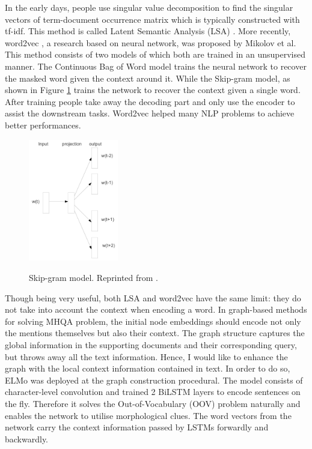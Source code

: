 \documentclass[12pt]{report}
\begin{document}
In the early days, people use singular value decomposition to find the singular vectors of term-document occurrence matrix which is typically constructed with tf-idf. This method is called Latent Semantic Analysis (LSA) \cite{dumais_using_1988}. More recently, word2vec \cite{mikolov_distributed_2013}, a research based on neural network, was proposed by Mikolov et al. This method consists of two models of which both are trained in an unsupervised manner. The Continuous Bag of Word model trains the neural network to recover the masked word given the context around it. While the Skip-gram model, as shown in Figure \ref{skip_gram} trains the network to recover the context given a single word. After training people take away the decoding part and only use the encoder to assist the downstream tasks. Word2vec helped many NLP problems to achieve
better performances.
\begin{figure}[H]
\centering
\includegraphics[width=0.35\textwidth]{figures/skip_gram.png}
\label{skip_gram}
\caption[Skip-gram]{Skip-gram model. Reprinted from \cite{mikolov_distributed_2013}.}
\end{figure}

Though being very useful, both LSA and word2vec have the same limit: they do not take into account the context when encoding a word.
In graph-based methods for solving MHQA problem, the initial node embeddings should encode not only the mentions themselves but also their context. The graph structure captures the global information in the supporting documents and their corresponding query, but throws away all the text information. Hence, I would like to enhance the graph with the local context information contained in text. In order to do so, ELMo \cite{peters_deep_2018} was deployed at the graph
construction procedural. The model consists of character-level convolution and trained 2 BiLSTM layers to encode sentences on the fly. Therefore it solves the Out-of-Vocabulary (OOV) problem naturally and enables the network to utilise morphological clues.
The word vectors from the network carry the context information passed by LSTMs forwardly and backwardly.
\end{document}
